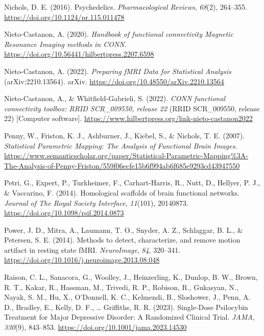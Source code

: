 \begin{CSLReferences}{1}{0}
Nichols, D. E. (2016). Psychedelics. \emph{Pharmacological Reviews},
\emph{68}(2), 264--355. \url{https://doi.org/10.1124/pr.115.011478}

Nieto-Castanon, A. (2020). \emph{Handbook of functional connectivity
Magnetic Resonance Imaging methods in CONN}.
\url{https://doi.org/10.56441/hilbertpress.2207.6598}

Nieto-Castanon, A. (2022). \emph{Preparing fMRI Data for Statistical
Analysis} (arXiv:2210.13564). arXiv.
\url{https://doi.org/10.48550/arXiv.2210.13564}

Nieto-Castanon, A., \& Whitfield-Gabrieli, S. (2022). \emph{CONN
functional connectivity toolbox: RRID SCR\_009550, release 22} (RRID
SCR\_009550, release 22) {[}Computer software{]}.
\url{https://www.hilbertpress.org/link-nieto-castanon2022}

Penny, W., Friston, K. J., Ashburner, J., Kiebel, S., \& Nichols, T. E.
(2007). \emph{Statistical Parametric Mapping: The Analysis of Functional
Brain Images}.
\url{https://www.semanticscholar.org/paper/Statistical-Parametric-Mapping\%3A-The-Analysis-of-Penny-Friston/559f06ecfe15b6f994ab6f685e9293cd43947550}

Petri, G., Expert, P., Turkheimer, F., Carhart-Harris, R., Nutt, D.,
Hellyer, P. J., \& Vaccarino, F. (2014). Homological scaffolds of brain
functional networks. \emph{Journal of The Royal Society Interface},
\emph{11}(101), 20140873. \url{https://doi.org/10.1098/rsif.2014.0873}

Power, J. D., Mitra, A., Laumann, T. O., Snyder, A. Z., Schlaggar, B.
L., \& Petersen, S. E. (2014). Methods to detect, characterize, and
remove motion artifact in resting state fMRI. \emph{NeuroImage},
\emph{84}, 320--341.
\url{https://doi.org/10.1016/j.neuroimage.2013.08.048}

Raison, C. L., Sanacora, G., Woolley, J., Heinzerling, K., Dunlop, B.
W., Brown, R. T., Kakar, R., Hassman, M., Trivedi, R. P., Robison, R.,
Gukasyan, N., Nayak, S. M., Hu, X., O'Donnell, K. C., Kelmendi, B.,
Sloshower, J., Penn, A. D., Bradley, E., Kelly, D. F., \ldots{}
Griffiths, R. R. (2023). Single-Dose Psilocybin Treatment for Major
Depressive Disorder: A Randomized Clinical Trial. \emph{JAMA},
\emph{330}(9), 843--853. \url{https://doi.org/10.1001/jama.2023.14530}


\end{CSLReferences}
